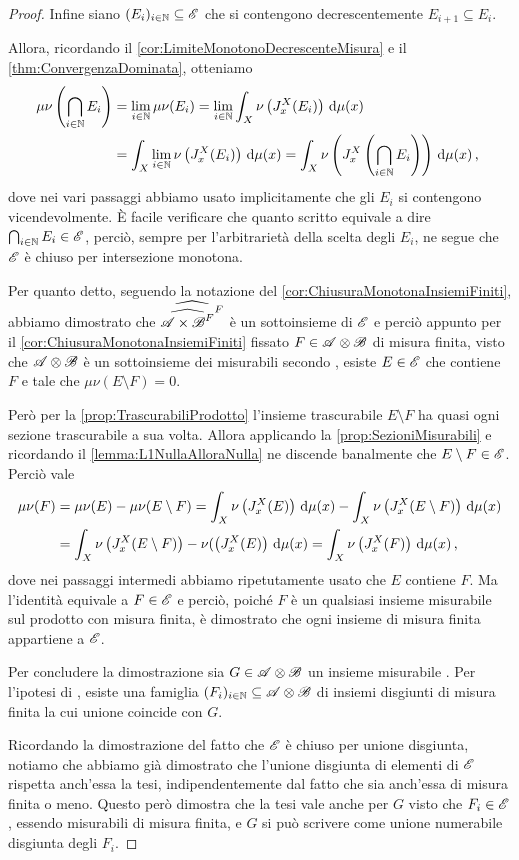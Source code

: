 \begin{proof}
	Infine siano $(E_i)_{i\in\mathbb N}\subseteq \mathscr E$ che si contengono decrescentemente $E_{i+1}\subseteq E_i$.
	
	Allora, ricordando il \cref{cor:LimiteMonotonoDecrescenteMisura} e il \cref{thm:ConvergenzaDominata}, otteniamo
	\begin{align*}
		\mu\nu\left(\bigcap_{i\in\mathbb N}E_i\right)&=\lim_{i\in\mathbb N}\mu\nu(E_i)=
		\lim_{i\in\mathbb N}\int_X\nu\left(J_x^X(E_i)\right)\,\mathrm d\mu(x)\\
		&=\int_X\lim_{i\in\mathbb N}\nu\left(J_x^X(E_i)\right)\,\mathrm d\mu(x)=
		\int_X\nu\left(J_x^X\left(\bigcap_{i\in\mathbb N}E_i\right)\right)\,\mathrm d\mu(x)\, \text{, }
	\end{align*}
	dove nei vari passaggi abbiamo usato implicitamente che gli $E_i$ si contengono vicendevolmente.
	È facile verificare che quanto scritto equivale a dire $\bigcap_{i\in\mathbb N}E_i\in\mathscr E$, perciò, sempre per l'arbitrarietà della scelta degli $E_i$, ne segue che $\mathscr E$ è chiuso per intersezione monotona.
	
	Per quanto detto, seguendo la notazione del \cref{cor:ChiusuraMonotonaInsiemiFiniti}, abbiamo dimostrato che $\widehat{\widehat{{\mathscr A\times\mathscr B}^F}^F}$ è un sottoinsieme di $\mathscr E$ e perciò appunto per il \cref{cor:ChiusuraMonotonaInsiemiFiniti} fissato $F\in\mathscr A\otimes\mathscr B$ di misura finita, visto che $\mathscr A\otimes\mathscr B$ è un sottoinsieme dei misurabili secondo \carat{}, esiste $E\in\mathscr E$ che contiene $F$ e tale che $\mu\nu(E\setminus F)=0$. 
	
	Però per la \cref{prop:TrascurabiliProdotto} l'insieme trascurabile $E\setminus F$ ha quasi ogni sezione trascurabile a sua volta.
	Allora applicando la \cref{prop:SezioniMisurabili} e ricordando il \cref{lemma:L1NullaAlloraNulla} ne discende banalmente che $E\setminus F\in\mathscr E$.
	Perciò vale
	\begin{align*}
		\mu\nu(F)&=\mu\nu(E)-\mu\nu(E\setminus F)=\int_X\nu\left(J_x^X(E)\right)\,\mathrm d\mu(x)-\int_X\nu\left(J_x^X(E\setminus F)\right)\,\mathrm d\mu(x)\\
		&=\int_X\nu\left(J_x^X(E\setminus F)\right)-\nu(\left(J_x^X(E)\right)\,\mathrm d\mu(x)
		=\int_X\nu\left(J_x^X(F)\right)\,\mathrm d\mu(x)\, \text{, }
	\end{align*}
	dove nei passaggi intermedi abbiamo ripetutamente usato che $E$ contiene $F$.
	Ma l'identità equivale a $F\in\mathscr E$ e perciò, poiché $F$ è un qualsiasi insieme misurabile sul prodotto con misura finita, è dimostrato che ogni insieme di misura finita appartiene a $\mathscr E$.
	
	Per concludere la dimostrazione sia $G\in\mathscr A\otimes\mathscr B$ un insieme misurabile \sigfin[o]. Per l'ipotesi di \sigfin[ezza], esiste una famiglia $(F_i)_{i\in\mathbb N}\subseteq \mathscr A\otimes\mathscr B$ di insiemi disgiunti di misura finita la cui unione coincide con $G$.
	
	Ricordando la dimostrazione del fatto che $\mathscr E$ è chiuso per unione disgiunta, notiamo che abbiamo già dimostrato che l'unione disgiunta di elementi di $\mathscr E$ rispetta anch'essa la tesi, indipendentemente dal fatto che sia anch'essa di misura finita o meno. Questo però dimostra che la tesi vale anche per $G$ visto che $F_i\in\mathscr E$, essendo misurabili di misura finita, e $G$ si può scrivere come unione numerabile disgiunta degli $F_i$. 
\end{proof}

